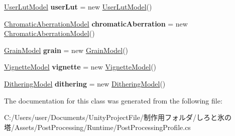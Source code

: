 \begin{DoxyCompactItemize}
\hyperlink{class_unity_engine_1_1_post_processing_1_1_user_lut_model}{User\+Lut\+Model} {\bfseries user\+Lut} = new \hyperlink{class_unity_engine_1_1_post_processing_1_1_user_lut_model}{User\+Lut\+Model}()
\item 
\mbox{\label{class_unity_engine_1_1_post_processing_1_1_post_processing_profile_a142138c77a670d153c04da81fc8dcff5}} 
\hyperlink{class_unity_engine_1_1_post_processing_1_1_chromatic_aberration_model}{Chromatic\+Aberration\+Model} {\bfseries chromatic\+Aberration} = new \hyperlink{class_unity_engine_1_1_post_processing_1_1_chromatic_aberration_model}{Chromatic\+Aberration\+Model}()
\item 
\mbox{\label{class_unity_engine_1_1_post_processing_1_1_post_processing_profile_ab2048238d01e1b60a859755167fae28a}} 
\hyperlink{class_unity_engine_1_1_post_processing_1_1_grain_model}{Grain\+Model} {\bfseries grain} = new \hyperlink{class_unity_engine_1_1_post_processing_1_1_grain_model}{Grain\+Model}()
\item 
\mbox{\label{class_unity_engine_1_1_post_processing_1_1_post_processing_profile_abee3b27a6acda75032c825ce759f2838}} 
\hyperlink{class_unity_engine_1_1_post_processing_1_1_vignette_model}{Vignette\+Model} {\bfseries vignette} = new \hyperlink{class_unity_engine_1_1_post_processing_1_1_vignette_model}{Vignette\+Model}()
\item 
\mbox{\label{class_unity_engine_1_1_post_processing_1_1_post_processing_profile_aa72f3687adc37b27032d21e3649001e3}} 
\hyperlink{class_unity_engine_1_1_post_processing_1_1_dithering_model}{Dithering\+Model} {\bfseries dithering} = new \hyperlink{class_unity_engine_1_1_post_processing_1_1_dithering_model}{Dithering\+Model}()
\end{DoxyCompactItemize}


The documentation for this class was generated from the following file\+:\begin{DoxyCompactItemize}
\item 
C\+:/\+Users/user/\+Documents/\+Unity\+Project\+File/制作用フォルダ/しろと氷の塔/\+Assets/\+Post\+Processing/\+Runtime/Post\+Processing\+Profile.\+cs\end{DoxyCompactItemize}
